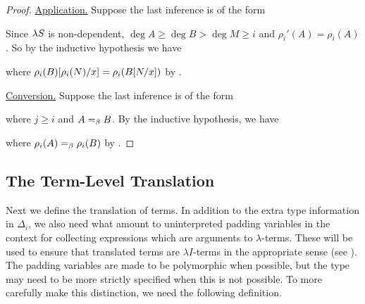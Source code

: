 \documentclass{article}
\begin{document}
\begin{proof}
\noindent\underline{Application.}
Suppose the last inference is of the form
\begin{prooftree}
\end{prooftree}
Since $\lS$ is non-dependent, $\deg A \geq \deg B > \deg M \geq i$ and $\rho_i'(A) = \rho_i(A)$.
So by the inductive hypothesis we have
\begin{prooftree}
\end{prooftree}
where $\sub {\rho_i(B)} {\rho_i(N)} x = \rho_i(\sub B N x)$ by .

\noindent\underline{Conversion.}
Suppose the last inference is of the form
\begin{prooftree}
\end{prooftree}
where $j \geq i$ and $A \eqbeta B$.
By the inductive hypothesis, we have
\begin{prooftree}
\end{prooftree}
where $\rho_i(A) \eqbeta \rho_i(B)$ by .
\end{proof}

\subsection{The Term-Level Translation}

Next we define the translation of terms.
In addition to the extra type information in $\Delta_i$, we also need what amount to uninterpreted padding variables in the context for collecting expressions which are arguments to $\lambda$-terms.
These will be used to ensure that translated terms are $\lambda I$-terms in the appropriate sense (see ).
The padding variables are made to be polymorphic when possible, but the type may need to be more strictly specified when this is not possible.
To more carefully make this distinction, we need the following definition.
\end{document}
